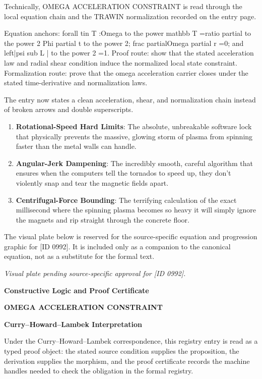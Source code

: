 Technically, OMEGA ACCELERATION CONSTRAINT is read through the local equation chain and the TRAWIN normalization recorded on the entry page.

Equation anchors: forall tin T :Omega to the power mathbb T =ratio partial to the power 2 Phi partial t to the power 2; frac partialOmega partial r =0; and left|psi sub L | to the power 2 =1. Proof route: show that the stated acceleration law and radial shear condition induce the normalized local state constraint. Formalization route: prove that the omega acceleration carrier closes under the stated time-derivative and normalization laws.

The entry now states a clean acceleration, shear, and normalization chain instead of broken arrows and double superscripts.
\endgroup

\begin{enumerate}[leftmargin=1.6em,itemsep=6pt,topsep=4pt]
\item \textbf{Rotational-Speed Hard Limits}: The absolute, unbreakable software lock that physically prevents the massive, glowing storm of plasma from spinning faster than the metal walls can handle.
\item \textbf{Angular-Jerk Dampening}: The incredibly smooth, careful algorithm that ensures when the computers tell the tornados to speed up, they don't violently snap and tear the magnetic fields apart.
\item \textbf{Centrifugal-Force Bounding}: The terrifying calculation of the exact millisecond where the spinning plasma becomes so heavy it will simply ignore the magnets and rip straight through the concrete floor.
\end{enumerate}

\begingroup\footnotesize\sloppy
The visual plate below is reserved for the source-specific equation and progression graphic for [ID 0992]. It is included only as a companion to the canonical equation, not as a substitute for the formal text.
\par\endgroup
\begingroup\footnotesize\itshape
Visual plate pending source-specific approval for [ID 0992].
\par\endgroup

\clearpage
\begingroup\tzpsupportsetup
\noindent\textbf{\fontsize{10.8pt}{12.8pt}\selectfont [ID 0992] Constructive Logic and Proof Certificate}\par
\noindent\textbf{\fontsize{10pt}{12pt}\selectfont OMEGA ACCELERATION CONSTRAINT}\par
\vspace{0.45em}
\begingroup
\footnotesize
\setlength{\parskip}{0.22em}
\setlength{\parindent}{0pt}
\noindent\textbf{Curry--Howard--Lambek Interpretation}\par
Under the Curry--Howard--Lambek correspondence, this registry entry is read as a typed proof
object: the stated source condition supplies the proposition, the derivation supplies the
morphism, and the proof certificate records the machine handles needed to check the obligation
in the formal registry.

